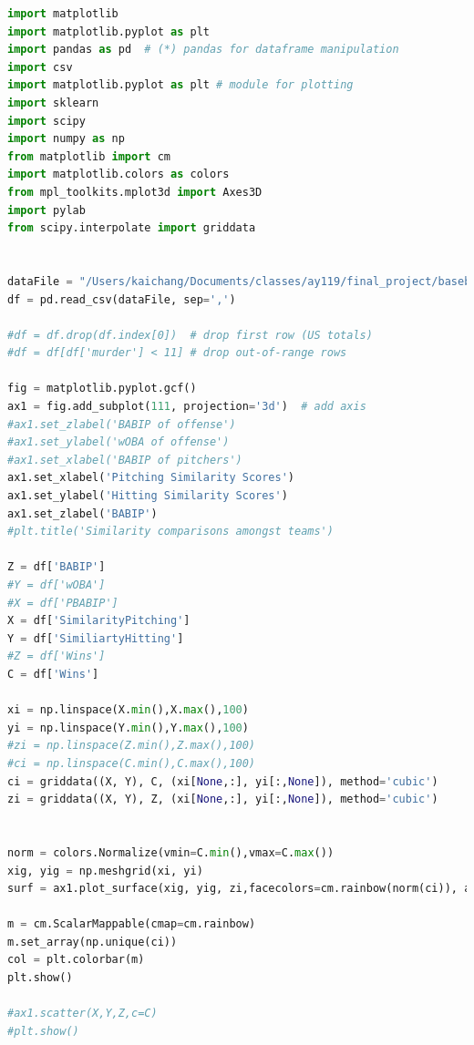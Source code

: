 \documentclass[12pt]{article}
\numberwithin{equation}{subsection}
\begin{document}
\begin{lstlisting}[language=Python, caption=4D Visualization (3d color mapping)]
import matplotlib
import matplotlib.pyplot as plt
import pandas as pd  # (*) pandas for dataframe manipulation
import csv
import matplotlib.pyplot as plt # module for plotting 
import sklearn
import scipy
import numpy as np
from matplotlib import cm
import matplotlib.colors as colors
from mpl_toolkits.mplot3d import Axes3D
import pylab
from scipy.interpolate import griddata


dataFile = "/Users/kaichang/Documents/classes/ay119/final_project/baseball-team-similarity-master/results/2015 Philadelphia Phillies.csv"
df = pd.read_csv(dataFile, sep=',')

#df = df.drop(df.index[0])  # drop first row (US totals) 
#df = df[df['murder'] < 11] # drop out-of-range rows

fig = matplotlib.pyplot.gcf()
ax1 = fig.add_subplot(111, projection='3d')  # add axis
#ax1.set_zlabel('BABIP of offense')
#ax1.set_ylabel('wOBA of offense')
#ax1.set_xlabel('BABIP of pitchers')
ax1.set_xlabel('Pitching Similarity Scores')
ax1.set_ylabel('Hitting Similarity Scores')
ax1.set_zlabel('BABIP')
#plt.title('Similarity comparisons amongst teams')

Z = df['BABIP']
#Y = df['wOBA'] 
#X = df['PBABIP']
X = df['SimilarityPitching']
Y = df['SimiliartyHitting']
#Z = df['Wins']
C = df['Wins']

xi = np.linspace(X.min(),X.max(),100)
yi = np.linspace(Y.min(),Y.max(),100)
#zi = np.linspace(Z.min(),Z.max(),100)
#ci = np.linspace(C.min(),C.max(),100)
ci = griddata((X, Y), C, (xi[None,:], yi[:,None]), method='cubic')
zi = griddata((X, Y), Z, (xi[None,:], yi[:,None]), method='cubic')


norm = colors.Normalize(vmin=C.min(),vmax=C.max())
xig, yig = np.meshgrid(xi, yi)
surf = ax1.plot_surface(xig, yig, zi,facecolors=cm.rainbow(norm(ci)), alpha=0.7)

m = cm.ScalarMappable(cmap=cm.rainbow)
m.set_array(np.unique(ci))
col = plt.colorbar(m)
plt.show()

#ax1.scatter(X,Y,Z,c=C)
#plt.show()
\end{lstlisting}
\end{document}

